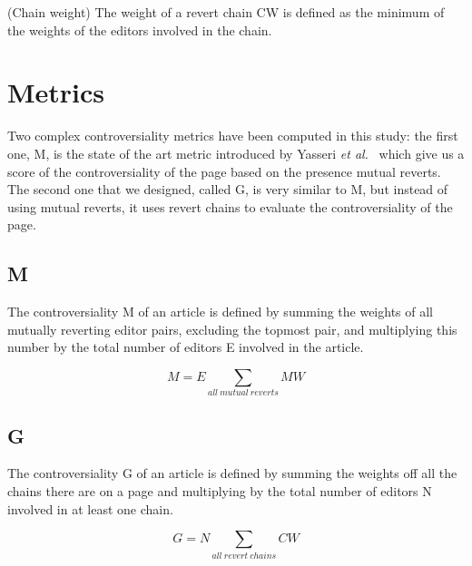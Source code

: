 \begin{Definition}
    (Chain weight) The weight of a revert chain CW is defined as the minimum of the weights of the editors involved in the chain.
\end{Definition}


\section{Metrics}
Two complex controversiality metrics have been computed in this study: the first one, M, is the state of the
art metric introduced by Yasseri \textit{et al.}~\cite{Yasseri2014} which give us a score of the controversiality of the page
based on the presence mutual reverts. The second one that we designed, called G, is very similar to M, but
instead of using mutual reverts, it uses revert chains to evaluate the controversiality of the page.  

\subsection{M}
The controversiality M of an article is defined by summing the weights of all mutually reverting
editor pairs, excluding the topmost pair, and multiplying this number by the total number of editors
E involved in the article.

\begin{equation}
    M = E   \sum_{all\ mutual\ reverts} MW
\end{equation}

\subsection{G}
The controversiality G of an article is defined by summing the weights off all the chains
there are on a page and multiplying by the total number of editors N involved in at least one chain.

\begin{equation}
    G = N \sum_{all\ revert\ chains} CW
\end{equation}




